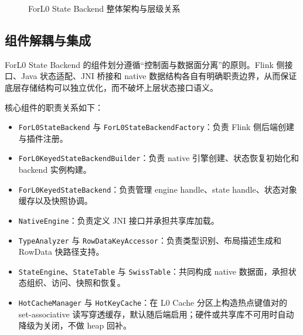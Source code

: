 \documentclass[a4paper,11pt]{article}
\newcommand{\project}{ForL0 State Backend}
\begin{document}
\begin{figure}[htbp]
\caption{\project{} 整体架构与层级关系}
\label{fig:overall}
\end{figure}

\subsection{组件解耦与集成}

\project{} 的组件划分遵循“控制面与数据面分离”的原则。Flink 侧接口、Java 状态适配、JNI 桥接和 native 数据结构各自有明确职责边界，从而保证底层存储结构可以独立优化，而不破坏上层状态接口语义。

核心组件的职责关系如下：

\begin{itemize}
  \item \texttt{ForL0StateBackend} 与 \texttt{ForL0StateBackendFactory}：负责 Flink 侧后端创建与插件注册。
  \item \texttt{ForL0KeyedStateBackendBuilder}：负责 native 引擎创建、状态恢复初始化和 backend 实例构建。
  \item \texttt{ForL0KeyedStateBackend}：负责管理 engine handle、state handle、状态对象缓存以及快照协调。
  \item \texttt{NativeEngine}：负责定义 JNI 接口并承担共享库加载。
  \item \texttt{TypeAnalyzer} 与 \texttt{RowDataKeyAccessor}：负责类型识别、布局描述生成和 RowData 快路径支持。
  \item \texttt{StateEngine}、\texttt{StateTable} 与 \texttt{SwissTable}：共同构成 native 数据面，承担状态组织、访问、快照和恢复。
  \item \texttt{HotCacheManager} 与 \texttt{HotKeyCache}：在 L0 Cache 分区上构造热点键值对的 set-associative 读写穿透缓存，默认随后端启用；硬件或共享库不可用时自动降级为关闭，不做 heap 回补。
\end{itemize}
\end{document}
